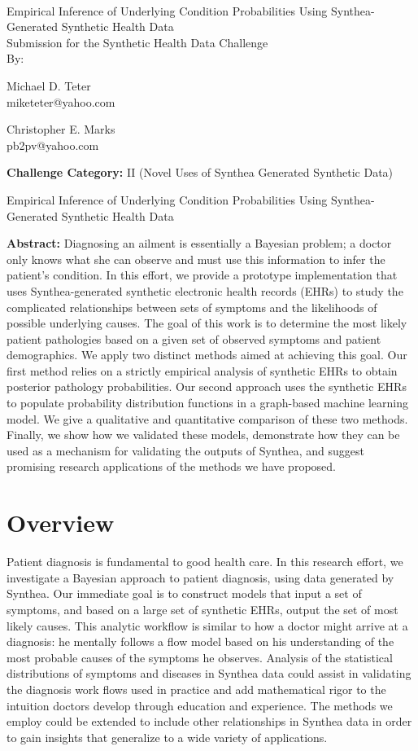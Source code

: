 \documentclass[11pt]{article}
\newcommand{\solutiontitle}{Empirical Inference of Underlying Condition Probabilities Using Synthea-Generated Synthetic Health Data}
\newcommand{\challengecategory}{II (Novel Uses of Synthea Generated Synthetic Data)}
\newcommand{\ABSTRACT}{Diagnosing an ailment is essentially a Bayesian problem; a doctor only knows what she can observe and must use this information to infer the patient's condition.  In this effort, we provide a prototype implementation that uses Synthea-generated synthetic electronic health records (EHRs) to study the complicated relationships between sets of symptoms and the likelihoods of possible underlying causes.  The goal of this work is to determine the most likely patient pathologies based on a given set of observed symptoms and patient demographics. We apply two distinct methods aimed at achieving this goal.  Our first method relies on a strictly empirical analysis of synthetic EHRs to obtain posterior pathology probabilities.  Our second approach uses the synthetic EHRs to populate probability distribution functions in a graph-based machine learning model.  We give a qualitative and quantitative comparison of these two methods.  Finally, we show how we validated these models, demonstrate how they can be used as a mechanism for validating the outputs of Synthea, and suggest promising research applications of the methods we have proposed.
}
\begin{document}

\thispagestyle{empty}

~

\begin{center}
    {\huge \solutiontitle} \\[24pt]
    {\Large Submission for the Synthetic Health Data Challenge} \\[24pt]
    {\Large By:} \\[24pt]
\end{center}

\begin{multicols}{2}
\begin{center}
	Michael D. Teter\\
	miketeter@yahoo.com
\end{center}

\columnbreak

\begin{center}
    Christopher E. Marks\\
    pb2pv@yahoo.com
\end{center}
\end{multicols}



\noindent \textbf{Challenge Category:} \challengecategory
\\


\clearpage


\setcounter{page}{1}

\begin{center}
  {\LARGE \solutiontitle}
  \\[11pt]
  \begin{minipage}{0.9\textwidth}
    \textbf{Abstract:}
    \ABSTRACT
  \end{minipage}
\end{center}


\section{Overview} \label{sec: overview}

Patient diagnosis is fundamental to good health care.  In this research effort, we investigate a Bayesian approach to patient diagnosis, using data generated by Synthea. Our immediate goal is to construct models that input a set of symptoms, and based on a large set of synthetic EHRs, output the set of most likely causes.  This analytic workflow is similar to how a doctor might arrive at a diagnosis: he mentally follows a flow model based on his understanding of the most probable causes of the symptoms he observes.  Analysis of the statistical distributions of symptoms and diseases in Synthea data could assist in validating the diagnosis work flows used in practice and add mathematical rigor to the intuition doctors develop through education and experience.  The methods we employ could be extended to include other relationships in Synthea data in order to gain insights that generalize to a wide variety of applications.
\end{document}
